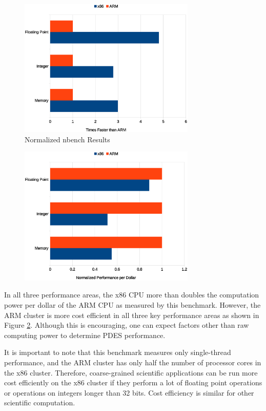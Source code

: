 \documentclass[11pt]{book}
\begin{document}
\begin{figure}
\centering
\includegraphics[width=0.75\textwidth]{nbench_performance}
\caption{Normalized nbench Results}
\label{nbench-performance}
\end{figure}


\begin{figure}
\centering
\includegraphics[width=0.75\textwidth]{nbench_cost}
\label{nbench-cost}
\end{figure}

In all three performance areas, the x86 CPU more than doubles the computation power per
dollar of the ARM CPU as measured by this benchmark.  However, the ARM cluster is more
cost efficient in all three key performance areas as shown in Figure
\ref{nbench-cost}. Although this is encouraging, one can expect factors other than raw
computing power to determine PDES performance.

It is important to note that this benchmark measures only single-thread performance, and
the ARM cluster has only half the number of processor cores in the x86 cluster. Therefore,
coarse-grained scientific applications can be run more cost efficiently on the x86 cluster
if they perform a lot of floating point operations or operations on integers longer than
32 bits. Cost efficiency is similar for other scientific computation.
\end{document}

